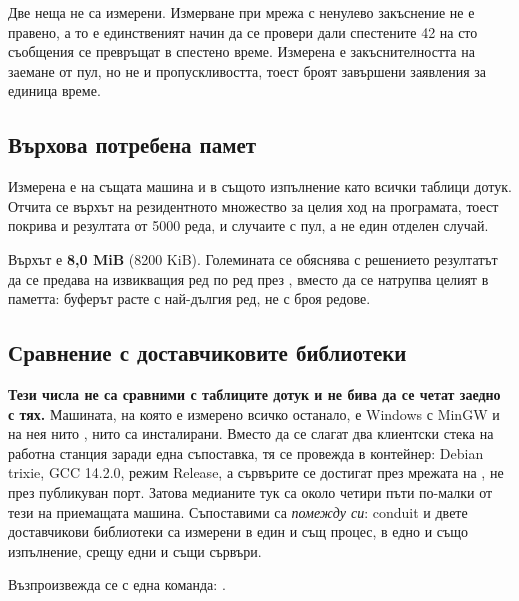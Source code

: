 Две неща не са измерени. Измерване при мрежа с ненулево
закъснение не е правено, а то е единственият начин да се провери дали спестените 42 на сто
съобщения се превръщат в спестено време. Измерена е закъснителността на заемане от пул, но не
и пропускливостта, тоест броят завършени заявления за единица време.

\subsection{Върхова потребена памет}

Измерена е на същата машина и в същото изпълнение като всички таблици дотук. Отчита се
върхът на резидентното множество за целия ход на програмата, тоест покрива и резултата от
5000 реда, и случаите с пул, а не един отделен случай.

Върхът е \textbf{8,0 MiB} (8200 KiB). Големината се обяснява с решението резултатът да се
предава на извикващия ред по ред през , вместо да се натрупва целият в
паметта: буферът расте с най-дългия ред, не с броя редове.

\subsection{Сравнение с доставчиковите библиотеки}
\label{sec:vendor}

\textbf{Тези числа не са сравними с таблиците дотук и не бива да се четат заедно с тях.}
Машината, на която е измерено всичко останало, е Windows с MinGW и на нея нито ,
нито  са инсталирани. Вместо да се слагат два клиентски стека на работна
станция заради една съпоставка, тя се провежда в контейнер: Debian trixie, GCC 14.2.0, режим
Release, а сървърите се достигат през мрежата на , не през публикуван порт.
Затова медианите тук са около четири пъти по-малки от тези на приемащата машина. Съпоставими
са \emph{помежду си}: conduit и двете доставчикови библиотеки са измерени в един и същ процес,
в едно и също изпълнение, срещу едни и същи сървъри.

Възпроизвежда се с една команда: .

